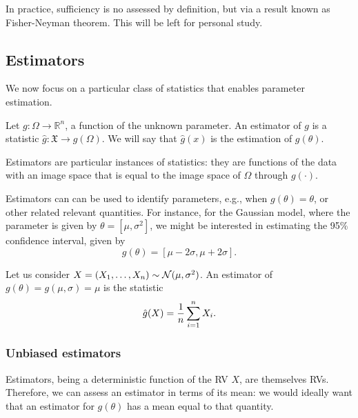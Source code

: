 In practice, sufficiency is no assessed by definition, but via a result known as Fisher-Neyman theorem. This will be left for personal study. 



\subsection{Estimators}

We now focus on a particular class of statistics that enables parameter estimation.

\begin{definition}[Estimator]
    Let $g:\Omega\rightarrow \mathbb{R}^n$, a function of the unknown parameter. An estimator of $g$ is a statistic $\hat{g}:\mathfrak{X}\rightarrow g(\Omega)$. We will say that $\hat{g}(x)$ is the estimation of $g(\theta)$. 
\end{definition}

\begin{remark}
    Estimators are particular instances of statistics: they are functions of the data with an image space that is equal to the image space of $\Omega$ through $g(\cdot)$.
\end{remark}

\begin{remark}
    Estimators can can be used to identify parameters, e.g., when $g(\theta)=\theta$, or other related relevant quantities. For instance, for the Gaussian model, where the parameter is given by $\theta = [\mu,\sigma^2]$, we might be interested in estimating the 95\% confidence interval, given by
    \begin{equation}
        g(\theta) = [\mu - 2\sigma,\mu + 2\sigma].
    \end{equation}
\end{remark}

\begin{example}
	\label{ex:estimador_media}
	Let us consider  $X = (X_1,\ldots,X_n)\sim{\mathcal N}(\mu,\sigma^2)$. An estimator of  $g(\theta) = g(\mu,\sigma) = \mu$ is the statistic
	\begin{equation}
	\nonumber
		{ \hat{g}}(X) = \frac{1}{n}\sum_{i=1}^nX_i.
	\end{equation} 
\end{example}



\subsubsection{Unbiased estimators} Estimators, being a deterministic function of the RV $X$, are themselves RVs. Therefore, we can assess an estimator in terms of its mean: we would ideally want that an estimator for $g(\theta)$ has a mean equal to that quantity.



